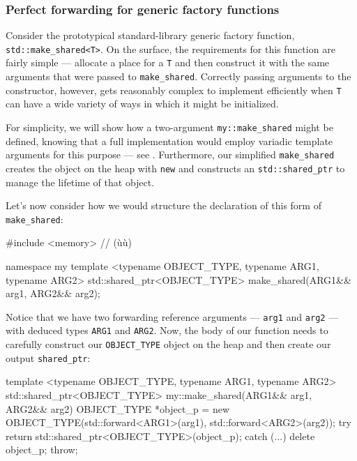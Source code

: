 \subsubsection[Perfect forwarding for generic factory functions]{Perfect forwarding for generic factory functions}\label{perfect-forwarding-for-generic-factory-functions}

Consider the prototypical standard-library generic factory function,
\lstinline!std::make_shared<T>!. On the surface, the requirements for this
function are fairly simple --- allocate a place for a \lstinline!T! and
then construct it with the same arguments that were passed to
\lstinline!make_shared!. Correctly passing arguments to the constructor, however, gets reasonably complex to
implement efficiently when \lstinline!T! can have a wide variety of ways in
which it might be initialized.

For simplicity, we will show how a two-argument \lstinline!my::make_shared!
might be defined, knowing that a full implementation would employ
variadic template arguments for this purpose --- see . 
Furthermore, our simplified \lstinline!make_shared! creates the object on the
heap with \lstinline!new! and constructs an \lstinline!std::shared_ptr! to
manage the lifetime of that object. 

Let's now consider how we would structure the declaration of this form of \lstinline!make_shared!:

\begin{emcppshiddenlisting}[emcppsbatch=e9]
#include <memory>  // (ù{}ù)
\end{emcppshiddenlisting}
\begin{emcppslisting}[emcppsbatch=e9]
namespace my {
template <typename OBJECT_TYPE, typename ARG1, typename ARG2>
std::shared_ptr<OBJECT_TYPE> make_shared(ARG1&& arg1, ARG2&& arg2);
}
\end{emcppslisting}

\noindent Notice that we have two forwarding reference arguments ---
\lstinline!arg1! and \lstinline!arg2! --- with deduced types \lstinline!ARG1! and
\lstinline!ARG2!. Now, the body of our function needs to carefully
construct our \lstinline!OBJECT_TYPE! object on the heap and then create
our output \lstinline!shared_ptr!:

\begin{emcppslisting}[emcppsbatch=e9]
template <typename OBJECT_TYPE, typename ARG1, typename ARG2>
std::shared_ptr<OBJECT_TYPE> my::make_shared(ARG1&& arg1, ARG2&& arg2)
{
    OBJECT_TYPE *object_p = new OBJECT_TYPE(std::forward<ARG1>(arg1),
                                               std::forward<ARG2>(arg2));
    try
    {
        return std::shared_ptr<OBJECT_TYPE>(object_p);
    }
    catch (...)
    {
        delete object_p;
        throw;
    }
}
\end{emcppslisting}

